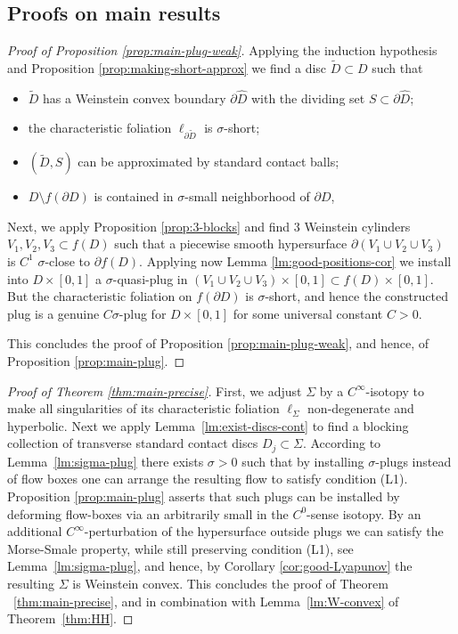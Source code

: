 \documentclass[12pt]{amsart}
\theoremstyle{plain}
\theoremstyle{definition}
\theoremstyle{remark}
\newcommand{\p}{\partial}
\newcommand{\wt}{\widetilde}
\newcommand{\wh}{\widehat}
\begin{document}
   \subsection{Proofs on main results}   \label{sec:proof-main}
   
    
  \begin{proof} [Proof of Proposition \ref{prop:main-plug-weak}]
   Applying the induction hypothesis  and Proposition \ref{prop:making-short-approx}  we find a disc $\wt D\subset D$ such that
    \begin{itemize}
 \item[-]  $\wt D$ has a Weinstein convex boundary  $\p\wh D$ with the dividing set $S\subset\p\wh D$;
 \item[-] the characteristic foliation $\ell_{\p\wt D}$ is $\sigma$-short;
 \item[-] $(\wt D,S)$ can be approximated by standard contact balls;
 \item[-]  $D\setminus f(\p D)$ is contained in $\sigma$-small neighborhood of $\p D$,
 \end{itemize}
         Next, we apply Proposition \ref{prop:3-blocks} and find $3$ Weinstein cylinders $V_1, V_2, V_3\subset f(D)$  such that  a piecewise smooth hypersurface $\p(V_1\cup V_2\cup V_3)$ is $C^1$ $\sigma$-close to $\p f(D)$. Applying now Lemma \ref{lm:good-positions-cor} we  install into $D\times[0,1]$ a $\sigma$-quasi-plug in $(V_1\cup V_2\cup V_3)\times[0,1]\subset f(D)\times[0,1]$. But the characteristic foliation on $f(\p D)$ is $\sigma$-short, and hence the constructed plug  is a genuine $C\sigma$-plug for $D\times [0,1]$ for some universal constant $C>0$.
 
 This concludes the proof    of   Proposition \ref{prop:main-plug-weak}, and hence, of Proposition \ref{prop:main-plug}.
\end{proof}
 \begin{proof}[Proof of Theorem \ref{thm:main-precise}]
 First, we adjust $\Sigma$ by  a  $C^\infty$-isotopy to make all singularities of its characteristic foliation $\ell_\Sigma$ non-degenerate and hyperbolic. Next we apply Lemma~\ref{lm:exist-discs-cont} to find a blocking collection of transverse standard contact discs $D_j\subset \Sigma$. According to Lemma~\ref{lm:sigma-plug} there exists  $\sigma>0$  such that by  installing $\sigma$-plugs instead of flow boxes one  can arrange  the resulting flow to satisfy condition (L1).
 Proposition \ref{prop:main-plug} asserts that such plugs can be installed by deforming flow-boxes via an arbitrarily small in the $C^0$-sense isotopy.   By an additional $C^\infty$-perturbation of the hypersurface outside plugs we can satisfy the  Morse-Smale property, while still preserving condition (L1), see Lemma~\ref{lm:sigma-plug}, and
hence,  by Corollary  \ref{cor:good-Lyapunov}   the resulting $\Sigma$ is Weinstein convex.
 This concludes the proof  of  Theorem ~\ref{thm:main-precise},  and  in combination with  
Lemma~\ref{lm:W-convex}   of Theorem~\ref{thm:HH}.
 \end{proof}
\end{document}
